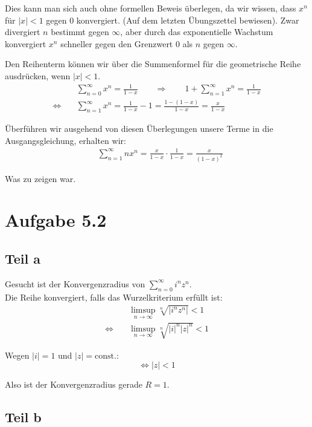 \documentclass[a4paper,german,12pt,smallheadings]{scrartcl}
\begin{document}
Dies kann man sich auch ohne formellen Beweis überlegen, da wir wissen, dass
$x^n$ für $|x|<1$ gegen 0 konvergiert. (Auf dem letzten Übungszettel bewiesen).
Zwar divergiert $n$ bestimmt gegen $\infty$, aber durch das exponentielle
Wachstum konvergiert $x^n$ schneller gegen den Grenzwert 0 als $n$ gegen
$\infty$.

Den Reihenterm können wir über die Summenformel für die geometrische Reihe ausdrücken, wenn $|x| < 1$.
\begin{align*}
  &\sum_{n=0}^\infty x^n = \frac{1}{1-x} \qquad\Rightarrow\qquad 1 + \sum_{n=1}^\infty x^n= \frac{1}{1-x}\\ 
  \Leftrightarrow\quad & \sum_{n=1}^\infty x^n =\frac{1}{1-x} - 1 = \frac{1-\left(1-x\right)}{1-x}= \frac{x}{1-x}
\end{align*}


Überführen wir ausgehend von diesen Überlegungen unsere Terme in die Ausgangsgleichung, erhalten wir:
\begin{align*}
  &\sum_{n=1}^\infty nx^n = \frac{x}{1-x} \cdot \frac{1}{1-x} = \frac{x}{(1-x)^2}
\end{align*}

Was zu zeigen war.

\section*{Aufgabe 5.2}
\subsection*{Teil a}

Gesucht ist der Konvergenzradius von $\sum\limits_{n=0}^{\infty} i^nz^n$.\\
Die Reihe konvergiert, falls das Wurzelkriterium erfüllt ist:
\begin{align*}
  & \limsup\limits_{n \to \infty} \sqrt[n]{|i^nz^n|}<1\\
  \Leftrightarrow\quad&\limsup\limits_{n \to \infty} \sqrt[n]{|i|^n|z|^n}<1
\end{align*}

Wegen $|i|=1$ und $|z|= \text{const.}$:
\begin{equation*}
\Leftrightarrow |z|<1
\end{equation*}

Also ist der Konvergenzradius gerade $R=1$.

\subsection*{Teil b}
\end{document}
